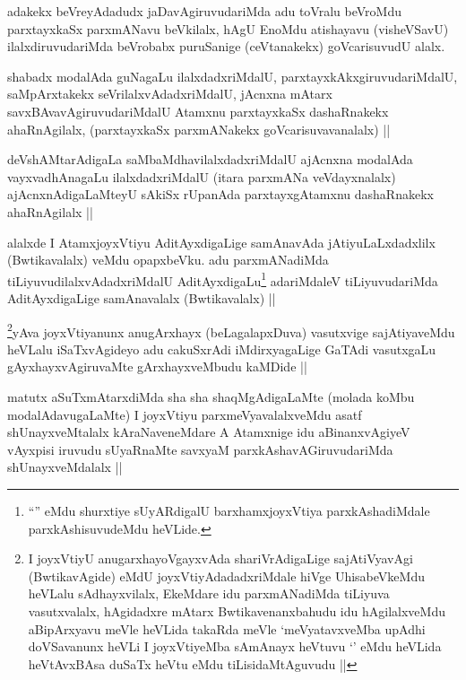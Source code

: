 \begin{artha}
adakekx beVreyAdadudx jaDavAgiruvudariMda adu toVralu beVroMdu parxtayxkaSx parxmANavu beVkilalx, hAgU EnoMdu atishayavu (visheVSavU) ilalxdiruvudariMda beVrobabx puruSanige (ceVtanakekx) goVcarisuvudU alalx.
\end{artha}

\begin{artha}
shabadx modalAda guNagaLu ilalxdadxriMdalU, parxtayxkAkxgiruvudariMdalU, saMpArxtakekx seVrilalxvAdadxriMdalU, jAcnxna mAtarx savxBAvavAgiruvudariMdalU Atamxnu parxtayxkaSx dashaRnakekx ahaRnAgilalx, (parxtayxkaSx parxmANakekx goVcarisuvavanalalx) ||
\end{artha}

\begin{artha}
deVshAMtarAdigaLa saMbaMdhavilalxdadxriMdalU ajAcnxna modalAda vayxvadhAnagaLu ilalxdadxriMdalU (itara parxmANa veVdayxnalalx) ajAcnxnAdigaLaMteyU sAkiSx rUpanAda parxtayxgAtamxnu dashaRnakekx ahaRnAgilalx ||
\end{artha}

\begin{artha}
alalxde I AtamxjoyxVtiyu AditAyxdigaLige samAnavAda jAtiyuLaLxdadxlilx (Bwtikavalalx) veMdu opapxbeVku. adu parxmANadiMda tiLiyuvudilalxvAdadxriMdalU AditAyxdigaLu\footnote{``\stext'' eMdu shurxtiye sUyARdigalU barxhamxjoyxVtiya parxkAshadiMdale parxkAshisuvudeMdu heVLide.} adariMdaleV tiLiyuvudariMda AditAyxdigaLige samAnavalalx (Bwtikavalalx) ||
\end{artha}

\begin{artha}
\footnote{I joyxVtiyU anugarxhayoVgayxvAda shariVrAdigaLige sajAtiVyavAgi (BwtikavAgide) eMdU joyxVtiyAdadadxriMdale hiVge UhisabeVkeMdu heVLalu sAdhayxvilalx, EkeMdare idu parxmANadiMda tiLiyuva vasutxvalalx, hAgidadxre mAtarx Bwtikavenanxbahudu idu hAgilalxveMdu aBipArxyavu meVle heVLida takaRda meVle `meVyatavxveMba upAdhi doVSavanunx heVLi I joyxVtiyeMba sAmAnayx heVtuvu `\stext' eMdu heVLida heVtAvxBAsa duSaTx heVtu eMdu tiLisidaMtAguvudu ||}yAva joyxVtiyanunx anugArxhayx (beLagalapxDuva) vasutxvige sajAtiyaveMdu heVLalu iSaTxvAgideyo adu cakuSxrAdi iMdirxyagaLige GaTAdi vasutxgaLu gAyxhayxvAgiruvaMte gArxhayxveMbudu kaMDide ||
\end{artha}

\begin{artha}
matutx aSuTxmAtarxdiMda sha sha shaqMgAdigaLaMte (molada koMbu modalAdavugaLaMte) I joyxVtiyu parxmeVyavalalxveMdu asatf shUnayxveMtalalx kAraNaveneMdare A Atamxnige idu aBinanxvAgiyeV vAyxpisi iruvudu sUyaRnaMte savxyaM parxkAshavAGiruvudariMda shUnayxveMdalalx ||
\end{artha}

